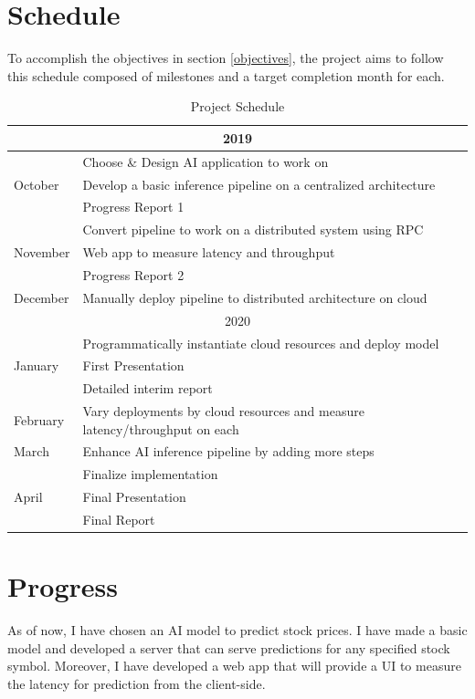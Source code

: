 \documentclass{report}
\begin{document}
\chapter{Schedule}\label{chap:schedule}
To accomplish the objectives in section \ref{objectives}, the project aims to follow this schedule composed of milestones and a target completion month for each.
\begin{table}[h!]
  \begin{center}
    \caption{Project Schedule}
    \label{tab:table1}
    \begin{tabular}{ |l|l| } 
      \hline
      \multicolumn{2}{|c|}{2019} \\ \hline
      \multirow{3}{*}{October} & Choose \& Design AI application to work on \\
       & Develop a basic inference pipeline on a centralized architecture \\
       & Progress Report 1 \\ \hline
      \multirow{3}{*}{November} & Convert pipeline to work on a distributed system using RPC \\
       & Web app to measure latency and throughput \\
       & Progress Report 2 \\ \hline
      December & Manually deploy pipeline to distributed architecture on cloud \\ \hline
      \multicolumn{2}{|c|}{2020} \\ \hline
      \multirow{3}{*}{January} & Programmatically instantiate cloud resources and deploy model \\
       & First Presentation \\
       & Detailed interim report \\ \hline
      February     & Vary deployments by cloud resources and measure latency/throughput on each  \\ \hline
      March     & Enhance AI inference pipeline by adding more steps  \\ \hline
      \multirow{3}{*}{April} & Finalize implementation \\
       & Final Presentation \\
       & Final Report \\ \hline
      \end{tabular}
  \end{center}
\end{table}

\chapter{Progress}\label{chap:progress}
As of now, I have chosen an AI model to predict stock prices. I have made a basic model and developed a server that can serve predictions for any specified stock symbol. Moreover, I have developed a web app that will provide a UI to measure the latency for prediction from the client-side.
\end{document}
